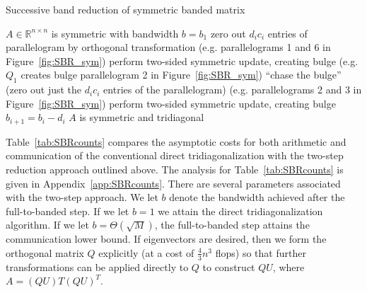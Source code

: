 \documentclass{article}
\theoremstyle{definition}
\begin{document}
\begin{algorithm}
\protect\caption{Successive band reduction of symmetric banded matrix}
\label{alg:sbr}
\begin{algorithmic}[1]
\REQUIRE $A\in\mathbb{R}^{n\times n}$ is symmetric with bandwidth $b=b_1$
		\STATE {}
		\STATE {}
			\STATE zero out $d_ic_i$ entries of parallelogram by orthogonal transformation (e.g. parallelograms 1 and 6 in Figure~\ref{fig:SBR_sym})
			\STATE perform two-sided symmetric update, creating bulge (e.g. $Q_1$ creates bulge parallelogram 2 in Figure~\ref{fig:SBR_sym})
				\STATE ``chase the bulge'' (zero out just the $d_ic_i$ entries of the parallelogram) (e.g. parallelograms 2 and 3 in Figure~\ref{fig:SBR_sym})
				\STATE perform two-sided symmetric update, creating bulge 
			\ENDFOR
		\ENDFOR
		\STATE $b_{i+1}=b_i-d_i$
	\ENDFOR 
\ENSURE $A$ is symmetric and tridiagonal
\end{algorithmic}
\end{algorithm}

Table~\ref{tab:SBRcounts} compares the asymptotic costs for both arithmetic and communication of the conventional direct tridiagonalization with the two-step reduction approach outlined above.  The analysis for Table~\ref{tab:SBRcounts} is given in Appendix~\ref{app:SBRcounts}.  There are several parameters associated with the two-step approach.  We let $b$ denote the bandwidth achieved after the full-to-banded step.  If we let $b=1$ we attain the direct tridiagonalization algorithm.  If we let $b=\Theta(\sqrt M)$, the full-to-banded step attains the communication lower bound.  If eigenvectors are desired, then we form the orthogonal matrix $Q$ explicitly (at a cost of $\frac43 n^3$ flops) so that further transformations can be applied directly to $Q$ to construct $QU$, where $A=(QU)T(QU)^T$.
\end{document}
